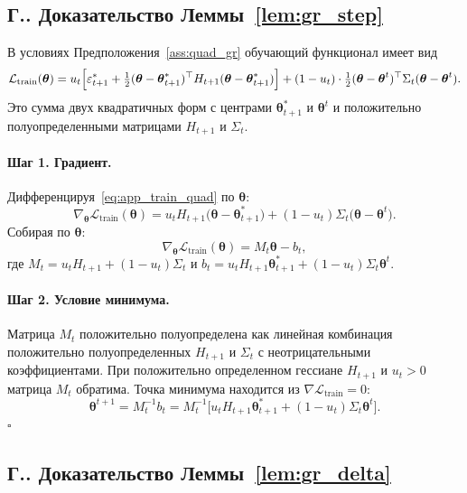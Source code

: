 \documentclass[a4paper,14pt,oneside,openany]{extarticle}
\newcommand{\cL}{\mathcal{L}}
\newcommand{\btheta}{\boldsymbol{\theta}}
\begin{document}
\setcounter{appthm}{0}
\renewcommand{\theappthm}{Г.}

\subsection*{\theappthm. Доказательство Леммы~\ref{lem:gr_step}}\label{app:proof_gr_step}

В условиях Предположения~\ref{ass:quad_gr} обучающий функционал имеет вид
\begin{equation}
    \cL_{\text{train}}(\btheta) = u_t\Bigl[\varepsilon^*_{t+1} + \tfrac{1}{2}(\btheta - \btheta^*_{t+1})^\top H_{t+1}(\btheta - \btheta^*_{t+1})\Bigr] + (1 - u_t)\cdot \tfrac{1}{2}(\btheta - \btheta^t)^\top \Sigma_t(\btheta - \btheta^t).
    \label{eq:app_train_quad}
\end{equation}
Это сумма двух квадратичных форм с центрами $\btheta^*_{t+1}$ и $\btheta^t$ и положительно полуопределенными матрицами $H_{t+1}$ и $\Sigma_t$.

\paragraph{Шаг 1. Градиент.} Дифференцируя~\eqref{eq:app_train_quad} по $\btheta$:
\[
    \nabla_{\btheta} \cL_{\text{train}}(\btheta) = u_t H_{t+1}\bigl(\btheta - \btheta^*_{t+1}\bigr) + (1 - u_t)\Sigma_t\bigl(\btheta - \btheta^t\bigr).
\]
Собирая по $\btheta$:
\[
    \nabla_{\btheta} \cL_{\text{train}}(\btheta) = M_t \btheta - b_t,
\]
где $M_t = u_t H_{t+1} + (1 - u_t)\Sigma_t$ и $b_t = u_t H_{t+1}\btheta^*_{t+1} + (1 - u_t)\Sigma_t\btheta^t$.

\paragraph{Шаг 2. Условие минимума.} Матрица $M_t$ положительно полуопределена как линейная комбинация положительно полуопределенных $H_{t+1}$ и $\Sigma_t$ с неотрицательными коэффициентами. При положительно определенном гессиане $H_{t+1}$ и $u_t > 0$ матрица $M_t$ обратима. Точка минимума находится из $\nabla \cL_{\text{train}} = 0$:
\[
    \btheta^{t+1} = M_t^{-1} b_t = M_t^{-1}\bigl[u_t H_{t+1}\btheta^*_{t+1} + (1 - u_t)\Sigma_t\btheta^t\bigr].
\]
\hfill$\square$

\subsection*{\theappthm. Доказательство Леммы~\ref{lem:gr_delta}}\label{app:proof_gr_delta}
\end{document}
